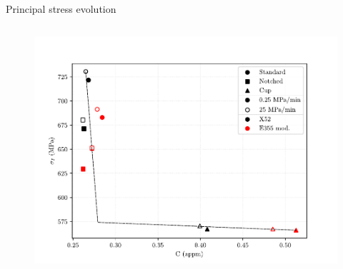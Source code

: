 \documentclass[9pt]{beamer}
\begin{document}
\begin{frame}{Principal stress evolution}
\begin{columns}
\begin{column}{0.49\textwidth}
	\begin{figure}
		\centering
		\includegraphics[width=\textwidth]{Images/plot_sigp1_C_edit.pdf} \\
	\end{figure}
\end{column}

\end{columns}

\end{frame}

\end{document}
